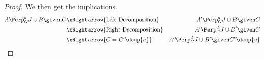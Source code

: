 \begin{Thm}
\begin{proof}
We then get the implications.
\begin{align*}
A  \Perp^d_G J \cup B \given C 
& \xRightarrow{\text{Left Decomposition}}  & A' \Perp^d_G J \cup B \given C \\
& \xRightarrow{\text{Right Decomposition}}  & A' \Perp^d_G J \cup B' \given C \\
& \xRightarrow{C = C' \dcup \{v\}}  & A' \Perp^d_G J \cup B' \given C'\dcup\{v\} \\
\end{align*}




\end{proof}
\end{Thm}
